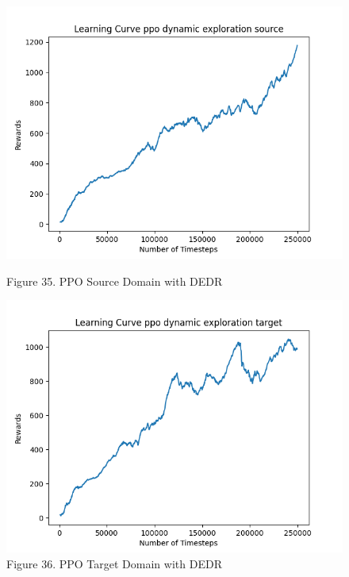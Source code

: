 \documentclass[12pt]{article}
\begin{document}
\begin{figure}[H]
    \vfill
    \begin{minipage}{0.45\textwidth}
        \centering
        \includegraphics[width=\textwidth]{../images/Learning_Curve_PPO_DE_Source.png}
        \caption{Figure 35. PPO Source Domain with DEDR}
        \label{fig:ppo_source_dedr}
    \end{minipage}
    \hfill
    \begin{minipage}{0.45\textwidth}
        \centering
        \includegraphics[width=\textwidth]{../images/Learning_Curve_PPO_DE_Target.png}
        \caption{Figure 36. PPO Target Domain with DEDR}
        \label{fig:ppo_target_dedr}
    \end{minipage}
\end{figure}
\end{document}
